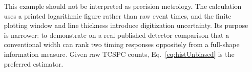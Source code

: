 This example should not be interpreted as precision metrology. The calculation uses a printed logarithmic figure rather than raw event times, and the finite plotting window and line thickness introduce digitization uncertainty. Its purpose is narrower: to demonstrate on a real published detector comparison that a conventional width can rank two timing responses oppositely from a full-shape information measure. Given raw TCSPC counts, Eq.~\eqref{eq:histUnbiased} is the preferred estimator.
